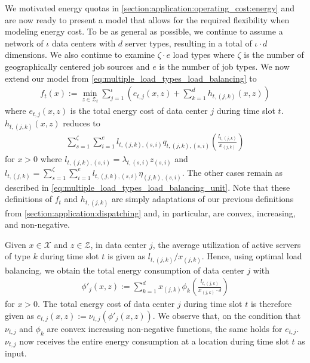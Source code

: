 We motivated energy quotas in \cref{section:application:operating_cost:energy} and are now ready to present a model that allows for the required flexibility when modeling energy cost. To be as general as possible, we continue to assume a network of $\iota$ data centers with $d$ server types, resulting in a total of $\iota \cdot d$ dimensions. We also continue to examine $\zeta \cdot e$ load types where $\zeta$ is the number of geographically centered job sources and $e$ is the number of job types. We now extend our model from \cref{eq:multiple_load_types_load_balancing} to \begin{align*}
    f_t(x) := \min_{z \in \mathcal{Z}_t} \sum_{j=1}^{\iota} \left(e_{t,j}(x,z) + \sum_{k=1}^{d} h_{t,(j,k)}(x,z)\right)
\end{align*} where $e_{t,j}(x,z)$ is the total energy cost of data center $j$ during time slot $t$. $h_{t,(j,k)}(x,z)$ reduces to \begin{align*}
    \sum_{s=1}^{\zeta} \sum_{i=1}^e l_{t,(j,k),(s,i)} q_{t,(j,k),(s,i)}\left(\frac{l_{t,(j,k)}}{x_{(j,k)}}\right)
\end{align*} for $x > 0$ where $l_{t,(j,k),(s,i)} = \lambda_{t,(s,i)} z_{(s,i)}$ and $l_{t,(j,k)} = \sum_{s=1}^{\zeta} \sum_{i=1}^e l_{t,(j,k),(s,i)} \eta_{(j,k),(s,i)}$. The other cases remain as described in \cref{eq:multiple_load_types_load_balancing_unit}. Note that these definitions of $f_t$ and $h_{t,(j,k)}$ are simply adaptations of our previous definitions from \cref{section:application:dispatching} and, in particular, are convex, increasing, and non-negative.

Given $x \in \mathcal{X}$ and $z \in \mathcal{Z}$, in data center $j$, the average utilization of active servers of type $k$ during time slot $t$ is given as $l_{t,(j,k)} / x_{(j,k)}$. Hence, using optimal load balancing, we obtain the total energy consumption of data center $j$ with \begin{align*}
    \phi'_j(x,z) := \sum_{k=1}^{d} x_{(j,k)} \phi_{k}\left(\frac{l_{t,(j,k)}}{x_{(j,k)} \cdot \delta}\right)
\end{align*} for $x > 0$. The total energy cost of data center $j$ during time slot $t$ is therefore given as $e_{t,j}(x,z) := \nu_{t,j}(\phi'_j(x,z))$. We observe that, on the condition that $\nu_{t,j}$ and $\phi_k$ are convex increasing non-negative functions, the same holds for $e_{t,j}$. $\nu_{t,j}$ now receives the entire energy consumption at a location during time slot $t$ as input.

